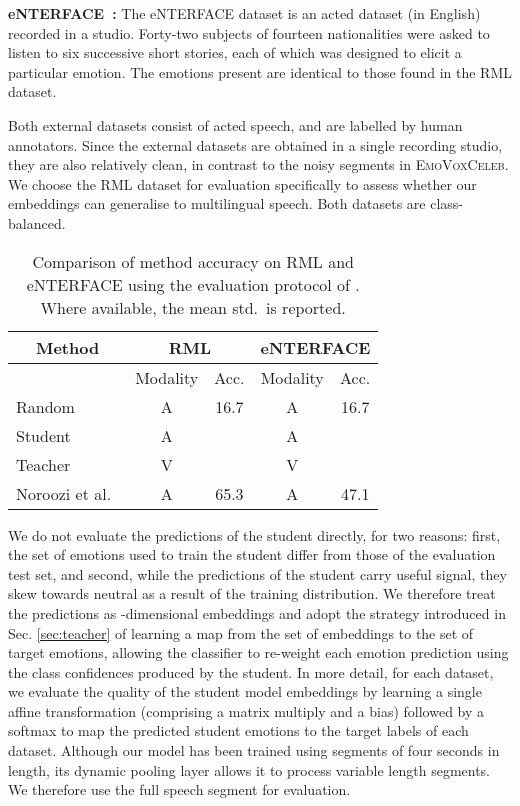 \documentclass[sigconf]{acmart}
\newcommand{\datasetName}{\textsc{EmoVoxCeleb}}
\begin{document}
\noindent\textbf{eNTERFACE~\cite{martin2006enterface}:} The eNTERFACE dataset is an acted dataset (in English) recorded in a studio. Forty-two subjects of fourteen nationalities were asked to listen to six successive short stories, each of which was designed to elicit a particular emotion. The emotions present are identical to those found in the RML dataset. 

Both external datasets consist of acted speech, and are labelled by human annotators. Since the external datasets are obtained in a single recording studio, they are also relatively clean, in contrast to the noisy segments in \datasetName. We choose the RML dataset for evaluation specifically to assess whether our embeddings can generalise to multilingual speech.  Both datasets are class-balanced. 

\begin{table}[h]
\footnotesize
\centering
\begin{tabular}{lcccc}
\multicolumn{1}{c}{Method }&\multicolumn{2}{c}{RML }&\multicolumn{2}{c}{eNTERFACE}\\
\hline
  & Modality &  Acc. & Modality &  Acc. \\
\hline         
Random  & A &  16.7  & A &  16.7    \\  
Student & A &  & A &  \\  
Teacher & V &  & V &   \\
Noroozi et al.~\cite{noroozi2017audio} & A & 65.3  & A & 47.1  \\

\end{tabular}
\normalsize
\caption{Comparison of method accuracy on RML and eNTERFACE using the evaluation protocol of \cite{noroozi2017audio}. Where available, the mean  std.\  is reported. \label{tab:results}}
\end{table}
\vspace{-0.7cm}
 
We do not evaluate the predictions of the student directly, for two reasons: first, the set of emotions used to train the student differ from those of the evaluation test set, and second, while the predictions of the student carry useful signal, they skew towards neutral as a result of the training distribution.  We therefore treat the predictions as -dimensional embeddings and adopt the strategy introduced in Sec. \ref{sec:teacher} of learning a map from the set of embeddings to the set of target emotions, allowing the classifier to re-weight each emotion prediction using the class confidences produced by the student.  In more detail, for each dataset, we evaluate the quality of the student model embeddings by learning a single affine transformation (comprising a matrix multiply and a bias) followed by a softmax to map the  predicted student emotions to the target labels of each dataset.  Although our model has been trained using segments of four seconds in length, its dynamic pooling layer allows it to process variable length segments.  We therefore use the full speech segment for evaluation.
\end{document}
